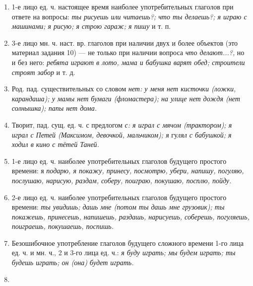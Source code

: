 \documentclass[a5paper]{book}
\renewcommand{\emph}[1]{\textit{#1}}
\begin{document}
\begin{enumerate}
\def\labelenumi{\arabic{enumi}.}
\item
  
  1-е лицо ед. ч. настоящее время наиболее употребительных глаголов при
  ответе на вопросы: \emph{ты рисуешь или читаешь?; что ты делаешь?; я
  играю с машинами; я рисую; я строю гараж; я пишу} и т. п.
  
\item
  
  3-е лицо мн. ч. наст. вр. глаголов при наличии двух и более объектов
  (это материал задания 10) --- не только при наличии вопроса \emph{что
  делают...?,} но и без него: \emph{ребята играют в лото, мама и бабушка
  варят обед; строители строят забор} и т. д.
  
\item
  
  Род. пад. существительных со словом \emph{нет: у меня нет кисточки
  (ложки, карандаша); у мамы нет бумаги (фломастера); на улице нет дождя
  (нет солнышка); папы нет дома.}
  
\item
  
  Творит, пад. сущ. ед. ч. с предлогом \emph{с: я играл с мячом
  (трактором); я играл с Петей (Максимом, девочкой, мальчиком); я}
  гу\emph{лял с бабушкой; я ходил в кино с тётей Таней.}
  
\item
  
  1-е лицо ед. ч. наиболее употребительных глаголов будущего простого
  времени: я \emph{подарю, я покажу, принесу, посмотрю, убери, напишу,
  погуляю, послушаю, нарисую, раздам, соберу, поиграю, покушаю, посплю,
  пойду.}
  
\item
  
  2-е лицо ед. ч. наиболее употребительных глаголов будущего простого
  времени: \emph{ты увидишь; дашь мне (потом ты дашь мне грузовик); ты
  покажешь, принесешь, напишешь, раздашь, нарисуешь, соберешь,
  погуляешь, поиграешь, покушаешь, поспишь.}
  
\item
  
  Безошибочное употребление глаголов будущего сложного времени 1-го лица
  ед. ч. и мн. ч., 2 и 3-го лица ед. ч.: \emph{я буду играть; мы будем
  играть; ты будешь играть; он (она) будет играть.}
  
\item
  

\end{enumerate}
\end{document}
